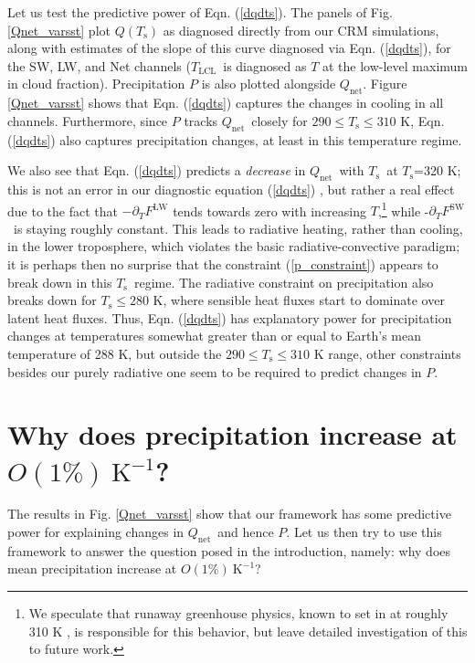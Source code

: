 \documentclass[10pt]{article}
\newcommand{\eqnref}[1]{(\ref{#1})}
\newcommand{\ppt}{\ensuremath{\partial_T}}
\newcommand{\Qnet}{\ensuremath{Q_\mathrm{net}}}
\newcommand{\FLW}{\ensuremath{F^\mathrm{LW}}}
\newcommand{\FSW}{\ensuremath{F^\mathrm{SW}}}
\newcommand{\Ts}{\ensuremath{T_\mathrm{s}}}
\newcommand{\Tlcl}{\ensuremath{T_\mathrm{LCL}}}
\newcommand{\Kinverse}{\ensuremath{\mathrm{K^{-1}}}}
\begin{document}
Let us test the predictive power of Eqn. \eqnref{dqdts}. The panels of Fig. \ref{Qnet_varsst} plot $Q(\Ts)$ as diagnosed directly from our CRM simulations, along with estimates of the slope of this curve diagnosed via  Eqn. \eqnref{dqdts}, for the SW, LW, and Net  channels (\Tlcl\ is diagnosed as $T$ at the low-level maximum in cloud fraction). Precipitation $P$ is also plotted alongside $\Qnet$.  Figure \ref{Qnet_varsst} shows that  Eqn. \eqnref{dqdts}  captures the changes in  cooling in all channels. Furthermore, since $P$ tracks \Qnet\ closely for $290\leq \Ts \leq 310$ K, Eqn. \eqnref{dqdts} also captures precipitation changes, at least in this temperature regime.

We also see that  Eqn. \eqnref{dqdts} predicts a \emph{decrease} in  \Qnet\ with \Ts\ at \Ts=320 K; this is not an error in our diagnostic equation \eqnref{dqdts} , but rather a real effect due to the fact that $-\ppt \FLW$ tends towards zero with increasing $T$,\footnote{We speculate that runaway greenhouse physics, known to set in at roughly 310 K \citep{goldblatt2013}, is responsible for this behavior, but leave detailed investigation of this to future work.} while -\ppt \FSW\ is staying roughly constant. This leads to radiative heating, rather than cooling, in the  lower troposphere, which violates the basic radiative-convective paradigm; it is perhaps then no surprise that the constraint \eqnref{p_constraint} appears to break down in this \Ts\ regime. The radiative constraint on precipitation also breaks down for $\Ts \leq 280$ K, where sensible heat fluxes start to dominate over latent heat fluxes. Thus, Eqn. \eqnref{dqdts} has explanatory power for  precipitation changes at  temperatures somewhat greater than or equal to Earth's mean temperature of 288 K, but outside the $290\leq \Ts \leq 310$ K range, other constraints besides our purely radiative one seem to be required to predict changes in $P$.


\section{Why does precipitation increase at $O(1\%)\ \Kinverse$?} \label{sec_1percent}
The results in Fig. \ref{Qnet_varsst} show that our framework  has some predictive power for explaining changes in \Qnet\ and hence $P$. Let us then try to use this framework to answer the question posed in the introduction, namely: why does mean precipitation increase at $O(1\%)\ \Kinverse$?
\end{document}
